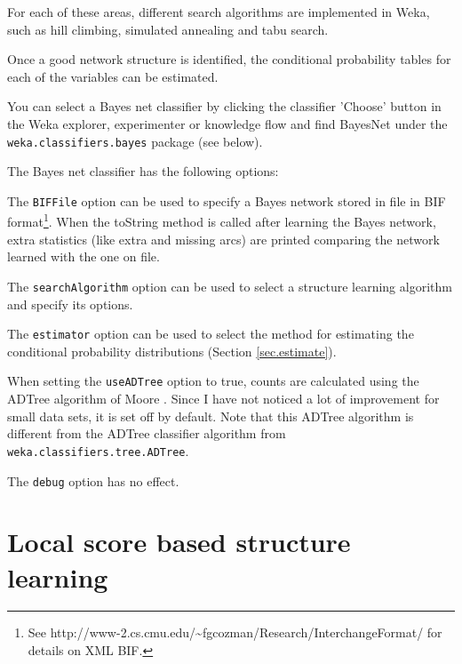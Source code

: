 \documentclass{article}
\begin{document}
For each of these areas, different search algorithms are implemented in 
Weka, such as hill climbing, simulated annealing and tabu search.

Once a good network structure is identified, the conditional probability
tables for each of the variables can be estimated.

You can select a Bayes net classifier by clicking the classifier 'Choose' button in 
the Weka explorer, experimenter or knowledge flow and find BayesNet
under the {\tt weka.classifiers.bayes} package (see below).%

\begin{center}
\end{center}

The Bayes net classifier has the following options:

\begin{center}
\end{center}

The {\tt BIFFile} option can be used to specify a Bayes network stored in
file in BIF format\footnote{See {\sf http://www-2.cs.cmu.edu/\~{}fgcozman/Research/InterchangeFormat/}
for details on XML BIF.}. When the toString method is called after learning the
Bayes network, extra statistics (like extra and missing arcs) are printed 
comparing the network learned with the one on file.

The {\tt searchAlgorithm} option can be used to select a structure learning
algorithm and specify its options.

The {\tt estimator} option can be used to select the method for estimating the
conditional probability distributions (Section \ref{sec.estimate}).

When setting the {\tt useADTree} option to true, counts are calculated using the
ADTree algorithm of Moore \cite{Moore}. Since I have not noticed a lot of 
improvement for small data sets, it is set off by default.
Note that this ADTree algorithm is different from the ADTree classifier algorithm
from {\tt weka.classifiers.tree.ADTree}.

The {\tt debug} option has no effect.

\section{Local score based structure learning\label{sec.score}}
\end{document}
